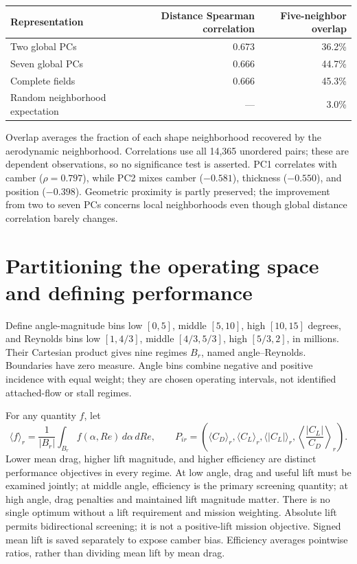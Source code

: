 \documentclass[10pt,a4paper]{article}
\begin{document}
\begin{center}
\begin{tabular}{lrr}
\toprule Representation & Distance Spearman correlation & Five-neighbor overlap\\
\midrule Two global PCs & 0.673 & 36.2\%\\
Seven global PCs & 0.666 & 44.7\%\\
Complete fields & 0.666 & 45.3\%\\
Random neighborhood expectation & --- & 3.0\%\\
\bottomrule
\end{tabular}
\end{center}
Overlap averages the fraction of each shape neighborhood recovered by the
aerodynamic neighborhood. Correlations use all 14,365 unordered pairs;
these are dependent observations, so no significance test is asserted.
PC1 correlates with camber ($\rho=0.797$), while PC2 mixes camber
($-0.581$), thickness ($-0.550$), and position ($-0.398$).
Geometric proximity is partly preserved; the improvement from two to seven
PCs concerns local neighborhoods even though global distance correlation barely changes.

\newpage
\section{Partitioning the operating space and defining performance}
Define angle-magnitude bins low $[0,5]$, middle $[5,10]$, high $[10,15]$
degrees, and Reynolds bins low $[1,4/3]$, middle $[4/3,5/3]$,
high $[5/3,2]$, in millions. Their Cartesian product gives nine regimes
$B_r$, named angle--Reynolds. Boundaries have zero measure. Angle bins combine
negative and positive incidence with equal weight; they are chosen operating
intervals, not identified attached-flow or stall regimes.

For any quantity $f$, let
\[
 \langle f\rangle_r=\frac{1}{|B_r|}\int_{B_r} f(\alpha,Re)\,d\alpha\,dRe,
 \qquad
 P_{ir}=\left(\langle C_D\rangle_r,\langle C_L\rangle_r,
 \langle|C_L|\rangle_r,\left\langle\frac{|C_L|}{C_D}\right\rangle_r\right).
\]
Lower mean drag, higher lift magnitude, and higher efficiency are distinct
performance objectives in every regime. At low angle, drag and useful lift
must be examined jointly; at middle angle, efficiency is the primary screening
quantity; at high angle, drag penalties and maintained lift magnitude matter.
There is no single optimum without a lift requirement and mission weighting.
Absolute lift permits bidirectional screening; it is not a positive-lift
mission objective. Signed mean lift is saved separately to expose camber bias.
Efficiency averages pointwise ratios, rather than dividing mean lift by mean drag.
\end{document}
